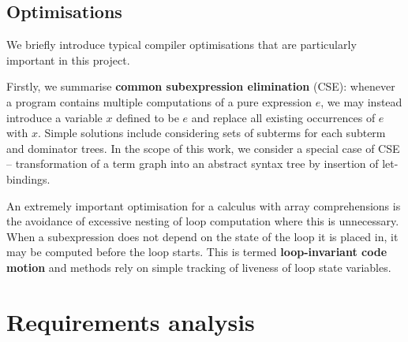 
\subsection{Optimisations} \label{general-optimisations}

We briefly introduce typical compiler optimisations that are particularly important in this project.

Firstly, we summarise \textbf{common subexpression elimination} (CSE): whenever a program contains multiple computations of a pure expression $e$, we may instead introduce a variable $x$ defined to be $e$ and replace all existing occurrences of $e$ with $x$. Simple solutions include considering sets of subterms for each subterm and dominator trees. In the scope of this work, we consider a special case of CSE -- transformation of a term graph into an abstract syntax tree by insertion of let-bindings.

An extremely important optimisation for a calculus with array comprehensions is the avoidance of excessive nesting of loop computation where this is unnecessary. When a subexpression does not depend on the state of the loop it is placed in, it may be computed before the loop starts. This is termed \textbf{loop-invariant code motion} and methods rely on simple tracking of liveness of loop state variables.

\section{Requirements analysis}

